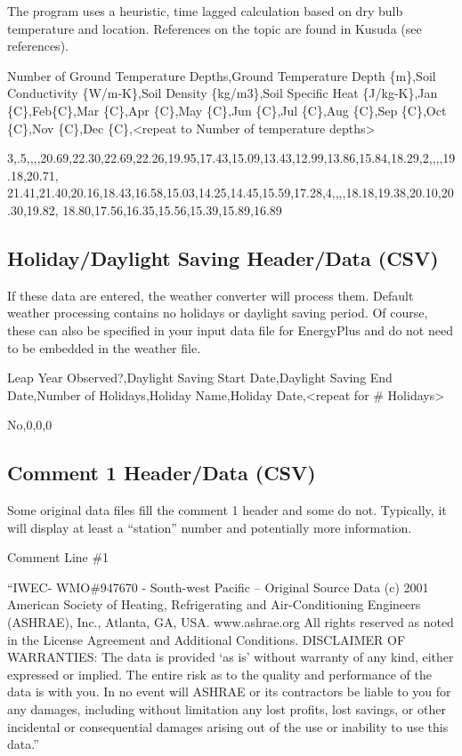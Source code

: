 The program uses a heuristic, time lagged calculation based on dry bulb temperature and location. References on the topic are found in Kusuda (see references).

Number of Ground Temperature Depths,Ground Temperature Depth \{m\},Soil Conductivity \{W/m-K\},Soil Density \{kg/m3\},Soil Specific Heat \{J/kg-K\},Jan \{C\},Feb\{C\},Mar \{C\},Apr \{C\},May \{C\},Jun \{C\},Jul \{C\},Aug \{C\},Sep \{C\},Oct \{C\},Nov \{C\},Dec \{C\},\textless{}repeat to Number of temperature depths\textgreater{}

3,.5,,,,20.69,22.30,22.69,22.26,19.95,17.43,15.09,13.43,12.99,13.86,15.84,18.29,2,,,,19.18,20.71, 21.41,21.40,20.16,18.43,16.58,15.03,14.25,14.45,15.59,17.28,4,,,,18.18,19.38,20.10,20.30,19.82, 18.80,17.56,16.35,15.56,15.39,15.89,16.89

\subsection{Holiday/Daylight Saving Header/Data (CSV)}\label{holidaydaylight-saving-headerdata-csv}

If these data are entered, the weather converter will process them. Default weather processing contains no holidays or daylight saving period. Of course, these can also be specified in your input data file for EnergyPlus and do not need to be embedded in the weather file.

Leap Year Observed?,Daylight Saving Start Date,Daylight Saving End Date,Number of Holidays,Holiday Name,Holiday Date,\textless{}repeat for \# Holidays\textgreater{}

No,0,0,0

\subsection{Comment 1 Header/Data (CSV)}\label{comment-1-headerdata-csv}

Some original data files fill the comment 1 header and some do not. Typically, it will display at least a ``station'' number and potentially more information.

Comment Line \#1

``IWEC- WMO\#947670 - South-west Pacific -- Original Source Data (c) 2001 American Society of Heating, Refrigerating and Air-Conditioning Engineers (ASHRAE), Inc., Atlanta, GA, USA. www.ashrae.org All rights reserved as noted in the License Agreement and Additional Conditions. DISCLAIMER OF WARRANTIES: The data is provided `as is' without warranty of any kind, either expressed or implied. The entire risk as to the quality and performance of the data is with you. In no event will ASHRAE or its contractors be liable to you for any damages, including without limitation any lost profits, lost savings, or other incidental or consequential damages arising out of the use or inability to use this data.''

